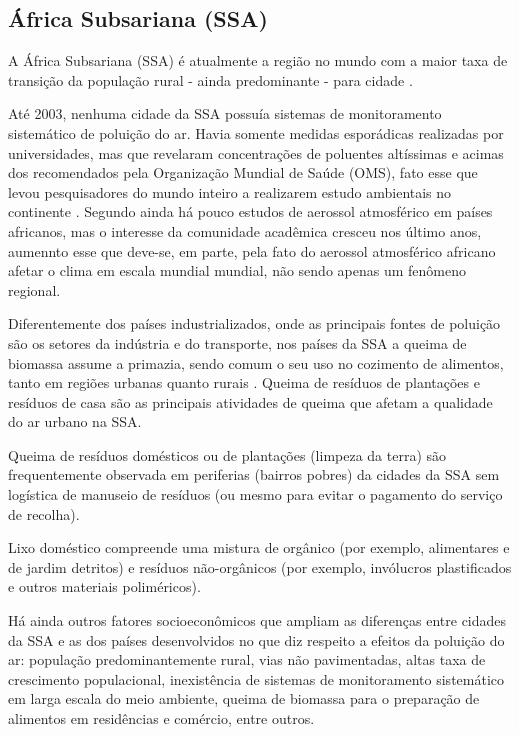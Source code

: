 \subsection{África Subsariana (SSA)}

A África Subsariana (SSA) é atualmente a região no mundo com a maior 
taxa de transição da população rural - ainda predominante - para cidade
\citep{MONTGOMERY2008}. 

Até 2003, nenhuma cidade da SSA possuía sistemas de monitoramento 
sistemático de poluição do ar. Havia somente medidas esporádicas realizadas
por universidades, mas que revelaram concentrações de poluentes altíssimas e 
acimas dos recomendados pela Organização Mundial de Saúde (OMS),
fato esse que levou pesquisadores do mundo inteiro a 
realizarem estudo ambientais no continente \citep{EZZATI2004}. 
Segundo \cite{aboh2009} ainda há pouco estudos de aerossol atmosférico 
em países africanos, mas o interesse da comunidade acadêmica cresceu
nos último anos, aumennto esse que deve-se, em parte, 
pela fato do aerossol atmosférico africano afetar o clima 
em escala mundial mundial, não sendo apenas um fenômeno regional.

Diferentemente dos países industrializados, onde as principais fontes de poluição 
são os setores da indústria e do transporte, nos países da SSA a 
queima de biomassa assume a primazia, sendo comum o seu uso no cozimento 
de alimentos, tanto em regiões urbanas quanto rurais \citep{SMITH2004}. 
Queima de resíduos de plantações e resíduos de casa são as principais 
atividades de queima que afetam a qualidade do ar urbano  na SSA.

Queima de resíduos domésticos ou de plantações (limpeza da terra) 
são frequentemente observada em periferias (bairros pobres) da cidades da 
SSA sem logística de manuseio de 
resíduos (ou mesmo para evitar o pagamento do serviço de recolha).

Lixo doméstico compreende uma mistura de orgânico 
(por exemplo, alimentares e de jardim detritos)
e resíduos não-orgânicos (por exemplo, invólucros plastificados e
outros materiais poliméricos).

Há ainda outros fatores socioeconômicos que ampliam as diferenças entre
cidades da SSA e as dos países desenvolvidos no que diz respeito
a efeitos da poluição do ar: população predominantemente rural,
vias não pavimentadas, altas taxa de crescimento populacional,
inexistência de sistemas de monitoramento sistemático em larga escala do meio 
ambiente, queima de biomassa para o preparação de alimentos em 
residências e comércio, entre outros. 

